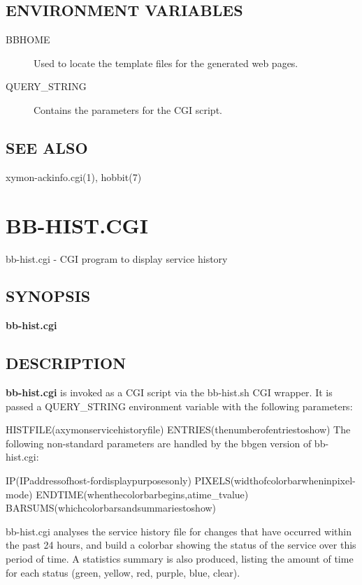\subsection{ENVIRONMENT VARIABLES}
\begin{description}
\item[BBHOME] Used to locate the template files for the generated web pages. 

 

\item[QUERY\_STRING] Contains the parameters for the CGI script. 

 


\end{description}
\subsection{SEE ALSO}
xymon-ackinfo.cgi(1), hobbit(7) 

  
%
\newpage
\section{BB-HIST.CGI}

 bb-hist.cgi - CGI program to display service history \subsection{SYNOPSIS}
\textbf{bb-hist.cgi}


 
\subsection{DESCRIPTION}
\textbf{bb-hist.cgi}
 is invoked as a CGI script via the bb-hist.sh CGI wrapper. It is
 passed a QUERY\_STRING environment variable with the following
 parameters: 


  
HISTFILE(axymonservicehistoryfile)  
ENTRIES(thenumberofentriestoshow)  
 The following non-standard parameters are handled by the bbgen version of bb-hist.cgi: 


  
IP(IPaddressofhost-fordisplaypurposesonly)  
PIXELS(widthofcolorbarwheninpixel-mode)  
ENDTIME(whenthecolorbarbegins,atime\_tvalue)  
BARSUMS(whichcolorbarsandsummariestoshow) 


  bb-hist.cgi analyses the service history file for changes that have
  occurred within the past 24 hours, and build a colorbar showing the
  status of the service over this period of time. A statistics summary
  is also produced, listing the amount of time for each status (green,
  yellow, red, purple, blue, clear). 



